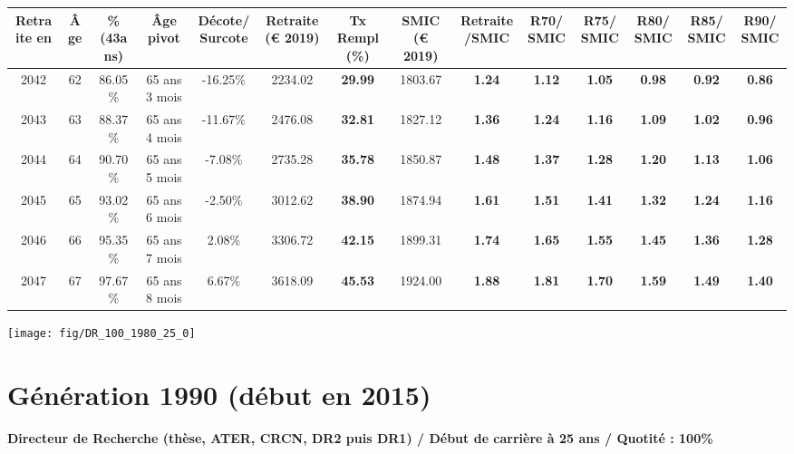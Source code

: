 \begin{adjustbox}{max width=\textwidth} 
\begin{tabular}[htb]{|c|c||c|c|c||c|c||c|c||c|c|c|c|c|} 
\hline 
 Retraite en &  Âge &  \%(43ans) &  Âge pivot &  Décote/Surcote &  Retraite (\euro{} 2019) &  Tx Rempl(\%) &  SMIC (\euro{} 2019) &  Retraite/SMIC &  R70/SMIC &  R75/SMIC &  R80/SMIC &  R85/SMIC &  R90/SMIC \\ 
\hline \hline 
 2042 &  62 &  86.05\% &  65 ans 3 mois &  -16.25\% &  2234.02 &  {\bf 29.99} &  1803.67 &  {\bf 1.24} &  {\bf 1.12} &  {\bf 1.05} &  {\bf {\color{red} 0.98}} &  {\bf {\color{red} 0.92}} &  {\bf {\color{red} 0.86}} \\ 
\hline 
 2043 &  63 &  88.37\% &  65 ans 4 mois &  -11.67\% &  2476.08 &  {\bf 32.81} &  1827.12 &  {\bf 1.36} &  {\bf 1.24} &  {\bf 1.16} &  {\bf 1.09} &  {\bf 1.02} &  {\bf {\color{red} 0.96}} \\ 
\hline 
 2044 &  64 &  90.70\% &  65 ans 5 mois &  -7.08\% &  2735.28 &  {\bf 35.78} &  1850.87 &  {\bf 1.48} &  {\bf 1.37} &  {\bf 1.28} &  {\bf 1.20} &  {\bf 1.13} &  {\bf 1.06} \\ 
\hline 
 2045 &  65 &  93.02\% &  65 ans 6 mois &  -2.50\% &  3012.62 &  {\bf 38.90} &  1874.94 &  {\bf 1.61} &  {\bf 1.51} &  {\bf 1.41} &  {\bf 1.32} &  {\bf 1.24} &  {\bf 1.16} \\ 
\hline 
 2046 &  66 &  95.35\% &  65 ans 7 mois &  2.08\% &  3306.72 &  {\bf 42.15} &  1899.31 &  {\bf 1.74} &  {\bf 1.65} &  {\bf 1.55} &  {\bf 1.45} &  {\bf 1.36} &  {\bf 1.28} \\ 
\hline 
 2047 &  67 &  97.67\% &  65 ans 8 mois &  6.67\% &  3618.09 &  {\bf 45.53} &  1924.00 &  {\bf 1.88} &  {\bf 1.81} &  {\bf 1.70} &  {\bf 1.59} &  {\bf 1.49} &  {\bf 1.40} \\ 
\hline 
\hline 
\end{tabular} 
\end{adjustbox} 
 
 \vspace{0.1cm} 

 {\hspace{-2.2cm}\texttt{[image: fig/DR\_100\_1980\_25\_0]}} 

\newpage 
 
\section{Génération 1990 (début en 2015)\label{DR_100_1990_25_0}} 
 
{\bf \noindent Directeur de Recherche (thèse, ATER, CRCN, DR2 puis DR1) / Début de carrière à 25 ans / Quotité : 100\%}  ~ 


